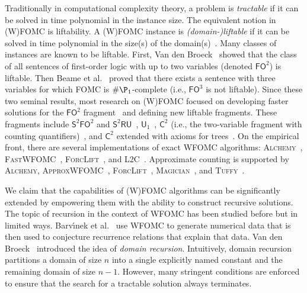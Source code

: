\documentclass{article}
\newcommand{\FOtwo}{$\mathsf{FO}^{2}$}
\newcommand{\FOthree}{$\mathsf{FO}^{3}$}
\newcommand{\SFO}{$\mathsf{S}^{2}\mathsf{FO}^{2}$}
\newcommand{\SRU}{$\mathsf{S}^{2}\mathsf{RU}$}
\newcommand{\Uone}{$\mathsf{U}_{1}$}
\newcommand{\Ctwo}{$\mathsf{C}^{2}$}
\begin{document}
Traditionally in computational complexity theory, a problem is \emph{tractable}
if it can be solved in time polynomial in the instance size. The equivalent
notion in (W)FOMC is liftability. A (W)FOMC instance is \emph{(domain-)liftable}
if it can be solved in time polynomial in the size(s) of the
domain(s)~\cite{DBLP:conf/starai/JaegerB12}. Many classes of instances are known
to be liftable. First, Van den Broeck~ showed
that the class of all sentences of first-order logic with up to two variables
(denoted \FOtwo{}) is liftable. Then Beame et
al.~ proved that there exists a sentence
with three variables for which FOMC is $\#\P_{1}$-complete (i.e., \FOthree{} is
not liftable). Since these two seminal results, most research on (W)FOMC focused
on developing faster solutions for the \FOtwo{}
fragment~\cite{DBLP:conf/uai/BremenK21,DBLP:conf/aaai/MalhotraS22} and defining
new liftable fragments. These fragments include \SFO{} and
\SRU{}~\cite{DBLP:conf/nips/KazemiKBP16},
\Uone{}~\cite{DBLP:conf/lics/KuusistoL18}, \Ctwo{} (i.e., the two-variable
fragment with counting
quantifiers)~\cite{DBLP:journals/jair/Kuzelka21,DBLP:conf/aaai/MalhotraS22}, and
\Ctwo{} extended with axioms for trees~\cite{DBLP:conf/kr/BremenK21}. On the
empirical front, there are several implementations of exact WFOMC algorithms:
\textsc{Alchemy}~\cite{DBLP:journals/cacm/GogateD16},
\textsc{FastWFOMC}~\cite{DBLP:conf/uai/BremenK21},
\textsc{ForcLift}~\cite{DBLP:conf/ijcai/BroeckTMDR11}, and
\textsc{L2C}~\cite{DBLP:conf/kr/KazemiP16}. Approximate counting is supported by
\textsc{Alchemy}, \textsc{ApproxWFOMC}~\cite{DBLP:conf/ijcai/BremenK20},
\textsc{ForcLift}~\cite{DBLP:conf/uai/BroeckCD12},
\textsc{Magician}~\cite{DBLP:conf/aaai/VenugopalSG15}, and
\textsc{Tuffy}~\cite{DBLP:journals/pvldb/NiuRDS11}.


We claim that the capabilities of (W)FOMC algorithms can be significantly
extended by empowering them with the ability to construct recursive solutions.
The topic of recursion in the context of WFOMC has been studied before but in
limited ways. Barv{\'{\i}}nek et al.~
use WFOMC to generate numerical data that is then used to conjecture recurrence
relations that explain that data. Van den
Broeck~ introduced the idea of \emph{domain
  recursion}. Intuitively, domain recursion partitions a domain of size $n$ into
a single explicitly named constant and the remaining domain of size $n-1$.
However, many stringent conditions are enforced to ensure that the search for a
tractable solution always terminates.
\end{document}
